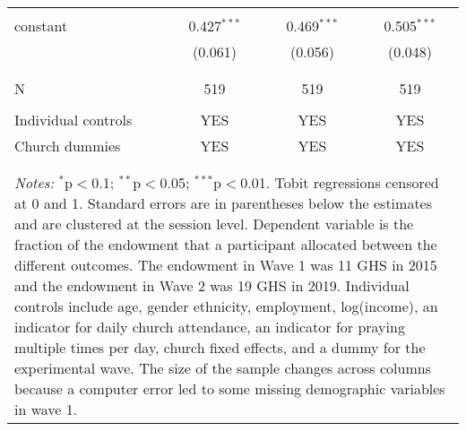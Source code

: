 \begin{table}[!htbp]
\begin{tabular}{@{\extracolsep{5pt}}lccc}
  & & & \\ 
 constant & 0.427$^{***}$ & 0.469$^{***}$ & 0.505$^{***}$ \\ 
  & (0.061) & (0.056) & (0.048) \\ 
  & & & \\ 
\cline{2-4} \\[-2.0ex]
N & 519 & 519 & 519 \\  \hline \\[-1.8ex] 
Individual controls & YES & YES & YES \\ 
Church dummies & YES & YES & YES \\ 
\\[-2.0ex]
\hline 
\hline \\[-1.8ex] 
\multicolumn{4}{l}{ \parbox[t]{0.95\linewidth}{\small{ \textit{Notes:} $^{*}$p$<$0.1; $^{**}$p$<$0.05; $^{***}$p$<$0.01}.  Tobit regressions censored at 0 and 1. Standard errors are in parentheses below the estimates and are clustered at the session level. Dependent variable is the fraction of the endowment that a participant allocated between the different outcomes. The endowment in Wave 1 was 11 GHS in 2015 and the endowment in Wave 2 was 19 GHS in 2019. Individual controls include age, gender ethnicity, employment, log(income), an indicator for daily church attendance, an indicator for praying multiple times per day, church fixed effects, and a dummy for the experimental wave. The size of the sample changes across columns because a computer error led to some missing demographic variables in wave 1. }}\\
\end{tabular} 
\end{table} 
